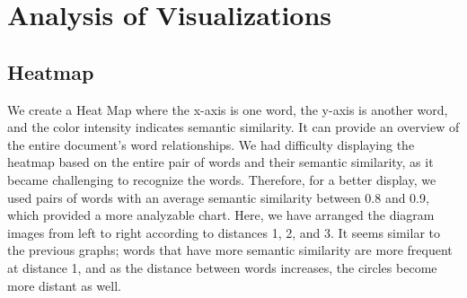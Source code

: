 \documentclass{article}
\begin{document}
\section{Analysis of Visualizations}

\subsection{Heatmap}

We create a Heat Map where the x-axis is one word, the y-axis is another word, and the color intensity indicates semantic similarity. It can provide an overview of the entire document's word relationships.
We had difficulty displaying the heatmap based on the entire pair of words and their semantic similarity, as it became challenging to recognize the words. Therefore, for a better display, we used pairs of words with an average semantic similarity between 0.8 and 0.9, which provided a more analyzable chart.
Here, we have arranged the diagram images from left to right according to distances 1, 2, and 3. It seems similar to the previous graphs; words that have more semantic similarity are more frequent at distance 1, and as the distance between words increases, the circles become more distant as well.
\end{document}
